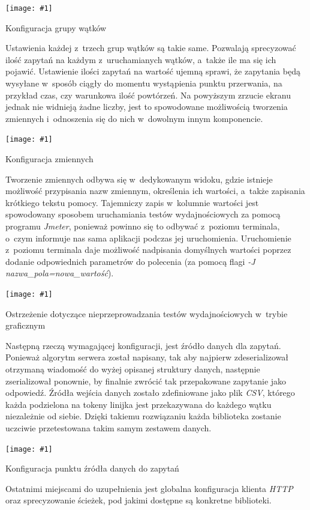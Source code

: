 \documentclass[12pt]{article}
\newcommand{\n}{\newline}
\newcommand{\putss}[3]{
\begin{captioned}[H]
	\centering
	\texttt{[image: \#1]}
	\caption{#2}
	\label{#3}
	\medskip
\end{captioned}
}
\newcommand{\nonpl}[1]{{\it #1}}
\newcommand{\code}[1]{{\it #1}}
\newcommand{\HTTP}{\nonpl{HTTP} }
\newcommand{\Jmeter}{\nonpl{Jmeter}\texttrademark}
\begin{document}
{{{				\putss{./img/jmeter_ss/thread_group_config.png}{ Konfiguracja grupy wątków}{jmeter_thread_config}

				Ustawienia każdej z~trzech grup wątków są takie same. Pozwalają sprecyzować ilość zapytań na każdym z~uruchamianych wątków, a~także ile ma się ich pojawić.
				Ustawienie ilości zapytań na wartość ujemną sprawi, że zapytania będą wysyłane w~sposób ciągły do momentu wystąpienia punktu przerwania, na przykład czas, czy warunkowa
				ilość powtórzeń. Na powyższym zrzucie ekranu jednak nie widnieją żadne liczby, jest to spowodowane możliwością tworzenia zmiennych i~odnoszenia się do nich w~dowolnym innym
				komponencie.\n

				\putss{./img/jmeter_ss/variables.png}{ Konfiguracja zmiennych}{jmeter_var_config}

				Tworzenie zmiennych odbywa się w~dedykowanym widoku, gdzie istnieje możliwość przypisania nazw zmiennym, określenia ich wartości, a~także zapisania krótkiego
				tekstu pomocy. Tajemniczy zapis w~kolumnie wartości jest spowodowany sposobem uruchamiania testów wydajnościowych za pomocą programu \Jmeter,
				ponieważ powinno się to odbywać z~poziomu terminala, o~czym informuje nas sama aplikacji podczas jej uruchomienia. Uruchomienie z~poziomu terminala daje możliwość
				nadpisania domyślnych wartości poprzez dodanie odpowiednich parametrów do polecenia (za pomocą flagi \code{-J nazwa\_pola=nowa\_wartość}).\n

				\putss{./img/jmeter_ss/jmeter_gui_warn.png}{ Ostrzeżenie dotyczące nieprzeprowadzania testów wydajnościowych w~trybie graficznym}{jmeter_warn}

				Następną rzeczą wymagającej konfiguracji, jest źródło danych dla zapytań. Ponieważ algorytm serwera został napisany, tak aby najpierw zdeserializował otrzymaną
				wiadomość do wyżej opisanej struktury danych, następnie zserializował ponownie, by finalnie zwrócić tak przepakowane zapytanie jako odpowiedź. Źródła wejścia danych
				zostało zdefiniowane jako plik \nonpl{CSV}, którego każda podzielona na tokeny linijka jest przekazywana do każdego wątku niezależnie od siebie. Dzięki takiemu rozwiązaniu
				każda biblioteka zostanie uczciwie przetestowana takim samym zestawem danych.\n


				\putss{./img/jmeter_ss/csv_config.png}{ Konfiguracja punktu źródła danych do zapytań}{jmeter_config_csv}

				Ostatnimi miejscami do uzupełnienia jest globalna konfiguracja klienta \HTTP oraz sprecyzowanie ścieżek, pod jakimi dostępne są konkretne biblioteki.

}}}
\end{document}

